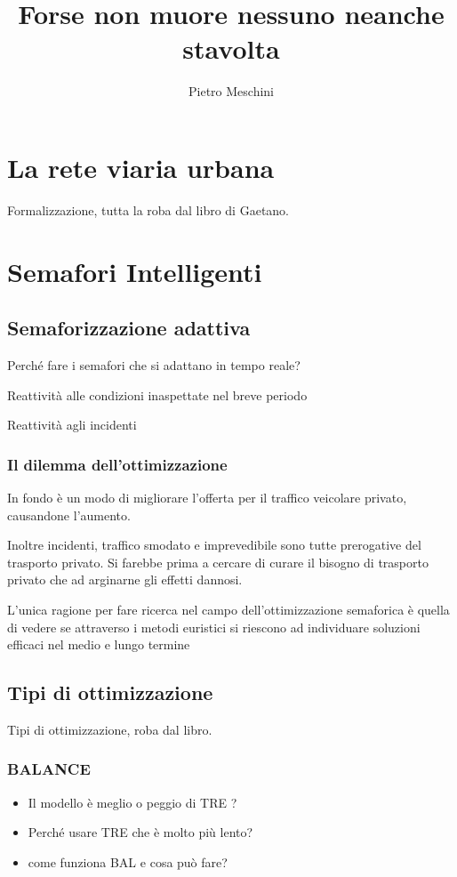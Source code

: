 \documentclass[10pt,a4paper,twoside]{book}
\author{Pietro Meschini}
\title{Forse non muore nessuno neanche stavolta}
\begin{document}
\chapter{La rete viaria urbana}
Formalizzazione, tutta la roba dal libro di Gaetano.

\chapter{Semafori Intelligenti}
\section{Semaforizzazione adattiva}
Perché fare i semafori che si adattano in tempo reale?

Reattività alle condizioni inaspettate nel breve periodo

Reattività agli incidenti

\subsection{Il dilemma dell'ottimizzazione}
In fondo è un modo di migliorare l'offerta per il traffico veicolare privato, causandone l'aumento.

Inoltre incidenti, traffico smodato e imprevedibile sono tutte prerogative del trasporto privato. Si farebbe prima a cercare di curare il bisogno di trasporto privato che ad arginarne gli effetti dannosi.

L'unica ragione per fare ricerca nel campo dell'ottimizzazione semaforica è quella di vedere se attraverso i metodi euristici si riescono ad individuare soluzioni efficaci nel medio e lungo termine 

\section{Tipi di ottimizzazione}
Tipi di ottimizzazione, roba dal libro.

\subsection{BALANCE}

\begin{itemize}
\item Il modello è meglio o peggio di TRE ?
\item Perché usare TRE che è molto più lento?
\item come funziona BAL e cosa può fare?
\end{itemize}
\end{document}
